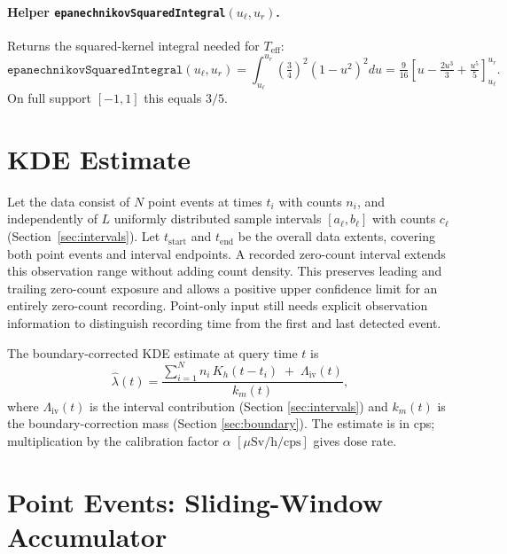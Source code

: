 \documentclass[11pt,a4paper]{article}
\newcommand{\h}{h}                   %
\newcommand{\km}{k_m}                %
\newcommand{\teff}{T_{\mathrm{eff}}} %
\begin{document}
\paragraph{Helper \texttt{epanechnikovSquaredIntegral}$(u_{\ell}, u_r)$.}
Returns the squared-kernel integral needed for $\teff$:
\begin{equation}
  \texttt{epanechnikovSquaredIntegral}(u_\ell, u_r)
    = \int_{u_\ell}^{u_r}\!\left(\tfrac{3}{4}\right)^2(1-u^2)^2 du
    = \tfrac{9}{16}\!\left[u - \tfrac{2u^3}{3} + \tfrac{u^5}{5}\right]_{u_\ell}^{u_r}.
  \label{eq:ep2Int}
\end{equation}
On full support $[-1,1]$ this equals $3/5$.

\section{KDE Estimate}

Let the data consist of $N$ point events at times $t_i$ with counts $n_i$,
and independently of $L$ uniformly distributed sample intervals
$[a_\ell, b_\ell]$ with counts $c_\ell$ (Section~\ref{sec:intervals}).
Let $t_{\mathrm{start}}$ and $t_{\mathrm{end}}$ be the overall data
extents, covering both point events and interval endpoints.  A recorded
zero-count interval extends this observation range without adding count
density.  This preserves leading and trailing zero-count exposure and
allows a positive upper confidence limit for an entirely zero-count
recording.  Point-only input still needs explicit observation information
to distinguish recording time from the first and last detected event.

The boundary-corrected KDE estimate at query time $t$ is
\begin{equation}
  \hat\lambda(t)
    = \frac{\displaystyle\sum_{i=1}^{N} n_i\, K_\h(t-t_i)
            \;+\; \Lambda_{\mathrm{iv}}(t)}
           {\km(t)},
  \label{eq:kde}
\end{equation}
where $\Lambda_{\mathrm{iv}}(t)$ is the interval contribution (Section
\ref{sec:intervals}) and $\km(t)$ is the boundary-correction mass (Section
\ref{sec:boundary}).  The estimate is in cps; multiplication by the
calibration factor $\alpha$ $[\mu\mathrm{Sv/h}/\mathrm{cps}]$ gives dose rate.

\section{Point Events: Sliding-Window Accumulator}
\label{sec:point}
\end{document}
